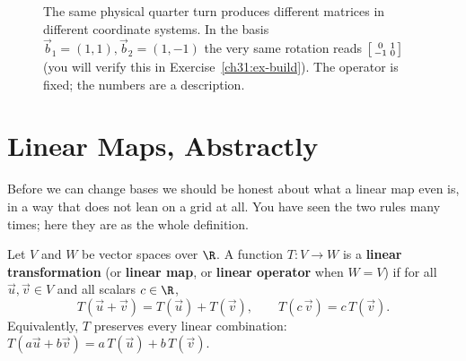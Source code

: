 \begin{figure}[H]
\centering
{}
\caption{The same physical quarter turn produces different matrices in different
coordinate systems. In the basis $\vec{b}_1=(1,1),\vec{b}_2=(1,-1)$ the very same
rotation reads $\protect\begin{bsmallmatrix}0&1\\-1&0\protect\end{bsmallmatrix}$
(you will verify this in Exercise~\ref{ch31:ex-build}). The operator is fixed; the
numbers are a description.}
\label{ch31:fig-operator-vs-matrix}
\end{figure}

\section{Linear Maps, Abstractly}
\label{ch31:linear-maps}

Before we can change bases we should be honest about what a linear map even is,
in a way that does not lean on a grid at all. You have seen the two rules many
times; here they are as the whole definition.

\begin{definition}
\label{ch31:def-linear}
Let $V$ and $W$ be vector spaces over $\R$. A function $T:V\to W$ is a
\textbf{linear transformation} (or \textbf{linear map}, or \textbf{linear
operator} when $W=V$) if for all $\vec{u},\vec{v}\in V$ and all scalars
$c\in\R$,
\[
  T(\vec{u}+\vec{v}) = T(\vec{u}) + T(\vec{v}),
  \qquad
  T(c\,\vec{v}) = c\,T(\vec{v}).
\]
Equivalently, $T$ preserves every linear combination:
$T(a\vec{u}+b\vec{v}) = a\,T(\vec{u}) + b\,T(\vec{v})$.
\end{definition}

